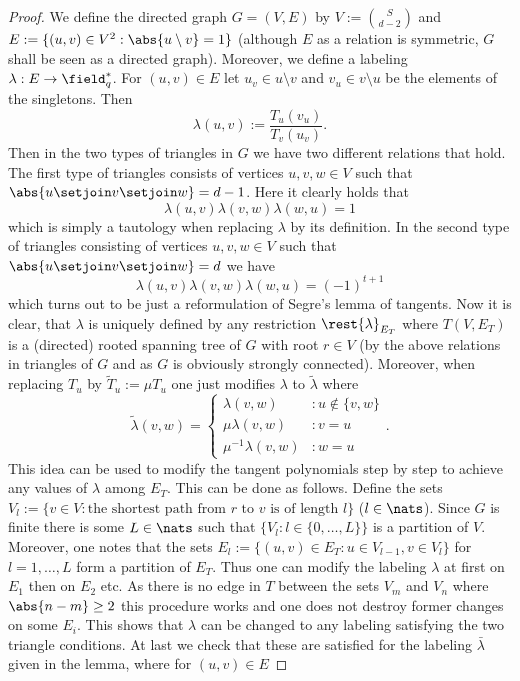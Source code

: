 \message{ !name(OnTheRAIDProblem.tex)}\documentclass[8pt,a4paper]{article}
\begin{document}
\begin{proof}
We define the directed graph $G=(V,E)$ by $V:=\binom{S}{d-2}$ and $E:=\{(u,v)\in V^2:\abs{u\setminus v}=1\}$ (although $E$ as a relation is symmetric, $G$ shall be seen as a directed graph).
Moreover, we define a labeling $\lambda:E\to \field_q^*$. For $(u,v)\in E$ let $u_v\in u\setminus v$ and $v_u\in v\setminus u$ be the elements of the singletons. Then 
\begin{equation}
\lambda(u,v):=\frac{T_u(v_u)}{T_v(u_v)}\text{.} 
\end{equation}
Then in the two types of triangles in $G$ we have two different relations that hold.
The first type of triangles consists of vertices $u,v,w\in V$ such that $\abs{u\setjoin v\setjoin w}=d-1$.
Here it clearly holds that
\begin{equation}
\lambda(u,v)\lambda(v,w)\lambda(w,u)=1
\end{equation}
which is simply a tautology when replacing $\lambda$ by its definition.
In the second type of triangles consisting of vertices $u,v,w\in V$ such that $\abs{u\setjoin v\setjoin w}=d$ we have
\begin{equation}
\lambda(u,v)\lambda(v,w)\lambda(w,u)=(-1)^{t+1}
\end{equation}
which turns out to be just a reformulation of Segre's lemma of tangents.
Now it is clear, that $\lambda$ is uniquely defined by any restriction $\rest{\lambda}_{E_T}$ where $T(V,E_T)$ is a (directed) rooted spanning tree of $G$ with root $r\in V$ (by the above relations in triangles of $G$ and as $G$ is obviously strongly connected).
Moreover, when replacing $T_u$ by $\tilde{T}_u:=\mu T_u$ one just modifies $\lambda$ to $\tilde{\lambda}$ where 
\begin{equation}
\tilde{\lambda}(v,w)=\begin{cases} 
\lambda(v,w) & : u\notin\{v,w\}\\
\mu\lambda(v,w) &: v=u\\
\mu^{-1}\lambda(v,w) &: w=u
\end{cases}\text{.}
\end{equation}
This idea can be used to modify the tangent polynomials step by step to achieve any values of $\lambda$ among $E_T$.
This can be done as follows. Define the sets $V_l:=\{v\in V: \text{the shortest path from } r \text{ to } v \text{ is of length } l\}$ ($l\in\nats$). Since $G$ is finite there is some $L\in\nats$ such that $\{V_l:l\in\{0,\ldots,L\}\}$ is a partition of $V$. Moreover, one notes that the sets $E_l:=\{(u,v)\in E_T:u\in V_{l-1},v\in V_l\}$ for $l=1,\ldots,L$ form a partition of $E_T$. Thus one can modify the labeling $\lambda$ at first on $E_1$ then on $E_2$ etc. As there is no edge in $T$ between the sets $V_m$ and $V_n$ where $\abs{n-m}\geq 2$ this procedure works and one does not destroy former changes on some $E_i$. 
This shows that $\lambda$ can be changed to any labeling satisfying the two triangle conditions.
At last we check that these are satisfied for the labeling $\bar{\lambda}$ given in the lemma, where for $(u,v)\in E$


\end{proof}
\end{document}
